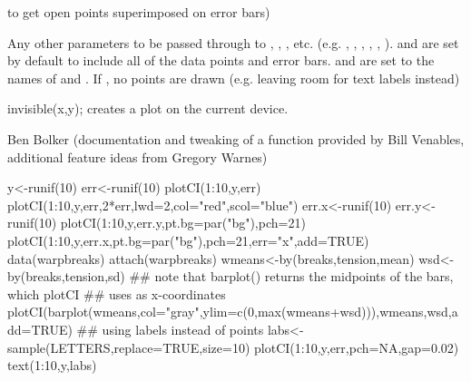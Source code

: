 \begin{Arguments}
\begin{ldescription}
to get open points superimposed on error bars)
\item[\code{...}] Any other parameters to be passed through to
, ,
, etc. (e.g. , , ,
, , ).   and
 are set by default to include all of the data points and
error bars.   and  are set to the names of
 and .  If , no points are drawn
(e.g. leaving room for text labels instead)
\end{ldescription}
\end{Arguments}
\begin{Value}
invisible(x,y); creates a plot on the current device.
\end{Value}
\begin{Author}\relax
Ben Bolker (documentation and tweaking of a function provided by
Bill Venables, additional feature ideas from Gregory Warnes)
\end{Author}
\begin{SeeAlso}\relax
{}
\end{SeeAlso}
\begin{Examples}
\begin{ExampleCode}
 y<-runif(10)
 err<-runif(10)
 plotCI(1:10,y,err)
 plotCI(1:10,y,err,2*err,lwd=2,col="red",scol="blue")
 err.x<-runif(10)
 err.y<-runif(10)
 plotCI(1:10,y,err.y,pt.bg=par("bg"),pch=21)
 plotCI(1:10,y,err.x,pt.bg=par("bg"),pch=21,err="x",add=TRUE)
 data(warpbreaks)
 attach(warpbreaks)
 wmeans<-by(breaks,tension,mean)
 wsd<-by(breaks,tension,sd)
 ## note that barplot() returns the midpoints of the bars, which plotCI
 ##  uses as x-coordinates
 plotCI(barplot(wmeans,col="gray",ylim=c(0,max(wmeans+wsd))),wmeans,wsd,add=TRUE)
 ## using labels instead of points
 labs<-sample(LETTERS,replace=TRUE,size=10)
 plotCI(1:10,y,err,pch=NA,gap=0.02)
 text(1:10,y,labs)
\end{ExampleCode}
\end{Examples}

